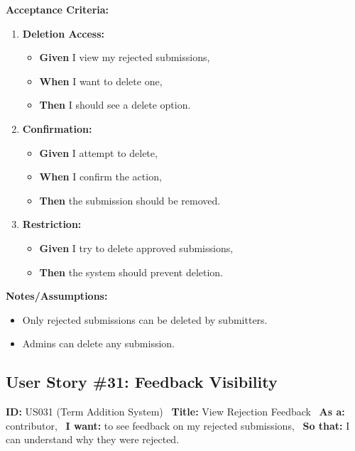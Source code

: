 \documentclass[12pt]{article}
\begin{document}
\vspace{1em}
\textbf{Acceptance Criteria:}
\begin{enumerate}
\item \textbf{Deletion Access:}
\begin{itemize}
\item \textbf{Given} I view my rejected submissions,
\item \textbf{When} I want to delete one,
\item \textbf{Then} I should see a delete option.
\end{itemize}

\item \textbf{Confirmation:}
\begin{itemize}
    \item \textbf{Given} I attempt to delete,
    \item \textbf{When} I confirm the action,
    \item \textbf{Then} the submission should be removed.
\end{itemize}

\item \textbf{Restriction:}
\begin{itemize}
    \item \textbf{Given} I try to delete approved submissions,
    \item \textbf{Then} the system should prevent deletion.
\end{itemize}
\end{enumerate}

\vspace{1em}
\textbf{Notes/Assumptions:}
\begin{itemize}
\item Only rejected submissions can be deleted by submitters.
\item Admins can delete any submission.
\end{itemize}

\subsection{User Story \#31: Feedback Visibility}
\textbf{ID:} US031 (Term Addition System) \
\textbf{Title:} View Rejection Feedback \
\textbf{As a:} contributor, \
\textbf{I want:} to see feedback on my rejected submissions, \
\textbf{So that:} I can understand why they were rejected.
\end{document}
